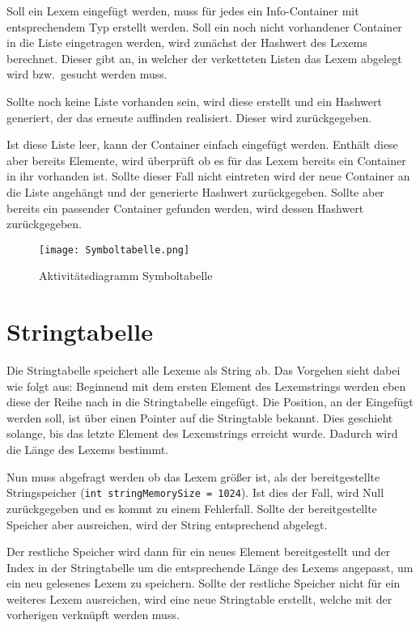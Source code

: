 Soll ein Lexem eingefügt werden, muss für jedes ein Info-Container mit entsprechendem Typ erstellt werden.
Soll ein noch nicht vorhandener Container in die Liste eingetragen werden, wird zunächst der Hashwert des Lexems berechnet. Dieser gibt an, in welcher der verketteten Listen das Lexem abgelegt wird bzw.~gesucht werden muss.

Sollte noch keine Liste vorhanden sein, wird diese erstellt und ein Hashwert generiert, der das erneute auffinden realisiert. Dieser wird zurückgegeben.

Ist diese Liste leer, kann der Container einfach eingefügt werden. Enthält diese aber bereits Elemente, wird überprüft ob es für das Lexem bereits ein Container in ihr vorhanden ist. Sollte dieser Fall nicht eintreten wird der neue Container an die Liste angehängt und der generierte Hashwert zurückgegeben. Sollte aber bereits ein passender Container gefunden werden, wird dessen Hashwert zurückgegeben.

\begin{figure}[!htb]
    \centering
      \texttt{[image: Symboltabelle.png]}
    \caption{Aktivitätsdiagramm Symboltabelle}\label{fig:symboltabelle}
\end{figure}

\section{Stringtabelle}
Die Stringtabelle speichert alle Lexeme als String ab.
Das Vorgehen sieht dabei wie folgt aus: Beginnend mit dem ersten Element des Lexemstrings werden eben diese der Reihe nach in die Stringtabelle eingefügt. Die Position, an der Eingefügt werden soll,  ist über einen Pointer auf die Stringtable bekannt. Dies geschieht solange, bis das letzte Element des Lexemstrings erreicht wurde. Dadurch wird die Länge des Lexems bestimmt.

Nun muss abgefragt werden ob das Lexem größer ist, als der bereitgestellte Stringspeicher (\texttt{int stringMemorySize = 1024}). Ist dies der Fall, wird Null zurückgegeben und es kommt zu einem Fehlerfall. Sollte der bereitgestellte Speicher aber ausreichen, wird der String entsprechend abgelegt.

Der restliche Speicher wird dann für ein neues Element bereitgestellt und der Index in der Stringtabelle um die entsprechende Länge des Lexems angepasst, um ein neu gelesenes Lexem zu speichern. Sollte der restliche Speicher nicht für ein weiteres Lexem ausreichen, wird eine neue Stringtable erstellt, welche mit der vorherigen verknüpft werden muss.

